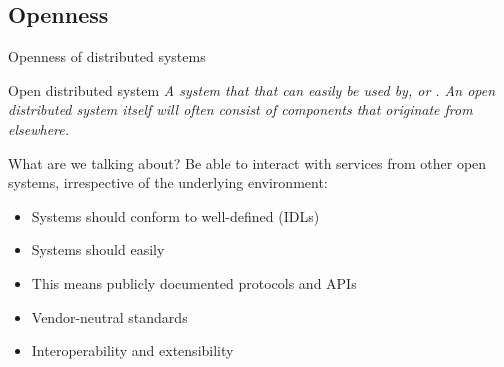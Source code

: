 \subsection{Openness}
\begin{frame}{Openness of distributed systems}
  \begin{block}{Open distributed system}
    \itshape A system that  that can easily be used by, or . An open distributed system itself will often consist of components that originate from
    elsewhere.
  \end{block}

  \begin{block}{What are we talking about?}
    Be able to interact with services from other open systems, irrespective of the underlying environment:
    \begin{itemize}\tightlist
      \item Systems should conform to well-defined  (IDLs)
      \item Systems should easily 
      \item This means publicly documented protocols and APIs
      \item Vendor-neutral standards
      \item Interoperability and extensibility
    \end{itemize}
  \end{block}
\end{frame}

